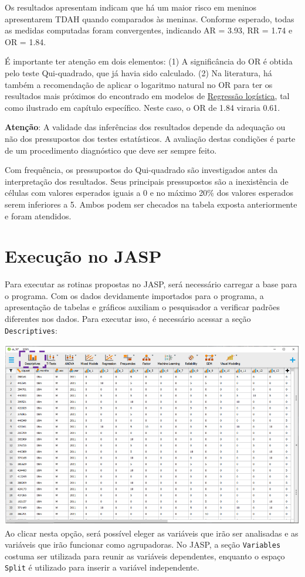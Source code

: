 \documentclass[
]{book}
\begin{document}
Os resultados apresentam indicam que há um maior risco em meninos apresentarem TDAH quando comparados às meninas. Conforme esperado, todas as medidas computadas foram convergentes, indicando AR = 3.93, RR = 1.74 e OR = 1.84.

É importante ter atenção em dois elementos: (1) A significância do OR é obtida pelo teste Qui-quadrado, que já havia sido calculado. (2) Na literatura, há também a recomendação de aplicar o logaritmo natural no OR para ter os resultados mais próximos do encontrado em modelos de \protect\hyperlink{17_regressao_logistica_binaria}{Regressão logística}, tal como ilustrado em capítulo específico. Neste caso, o OR de 1.84 viraria 0.61.

\textbf{Atenção}: A validade das inferências dos resultados depende da adequação ou não dos pressupostos dos testes estatísticos. A avaliação destas condições é parte de um procedimento diagnóstico que deve ser sempre feito.

Com frequência, os pressupostos do Qui-quadrado são investigados antes da interpretação dos resultados. Seus principais pressupostos são a inexistência de células com valores esperados iguais a 0 e no máximo 20\% dos valores esperados serem inferiores a 5. Ambos podem ser checados na tabela exposta anteriormente e foram atendidos.

\hypertarget{execuuxe7uxe3o-no-jasp-2}{%
\section{Execução no JASP}\label{execuuxe7uxe3o-no-jasp-2}}

Para executar as rotinas propostas no JASP, será necessário carregar a base para o programa. Com os dados devidamente importados para o programa, a apresentação de tabelas e gráficos auxiliam o pesquisador a verificar padrões diferentes nos dados. Para executar isso, é necessário acessar a seção \texttt{Descriptives}:

\includegraphics{./img/jasp_descriptives.png}
Ao clicar nesta opção, será possível eleger as variáveis que irão ser analisadas e as variáveis que irão funcionar como agrupadoras. No JASP, a seção \texttt{Variables} costuma ser utilizada para reunir as variáveis dependentes, enquanto o espaço \texttt{Split} é utilizado para inserir a variável independente.
\end{document}

